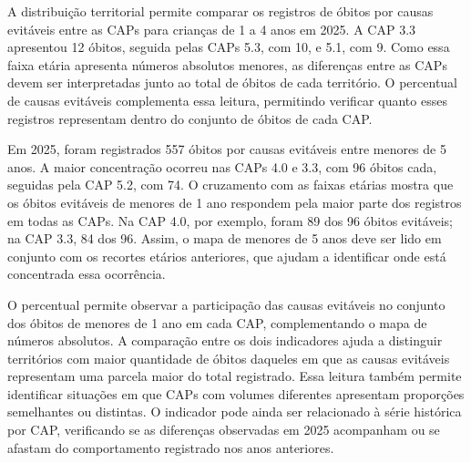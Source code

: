
A distribuição territorial permite comparar os registros de óbitos por causas evitáveis entre as CAPs para crianças de 1 a 4 anos em 2025. A CAP 3.3 apresentou 12 óbitos, seguida pelas CAPs 5.3, com 10, e 5.1, com 9. Como essa faixa etária apresenta números absolutos menores, as diferenças entre as CAPs devem ser interpretadas junto ao total de óbitos de cada território. O percentual de causas evitáveis complementa essa leitura, permitindo verificar quanto esses registros representam dentro do conjunto de óbitos de cada CAP.


Em 2025, foram registrados 557 óbitos por causas evitáveis entre menores de 5 anos. A maior concentração ocorreu nas CAPs 4.0 e 3.3, com 96 óbitos cada, seguidas pela CAP 5.2, com 74. O cruzamento com as faixas etárias mostra que os óbitos evitáveis de menores de 1 ano respondem pela maior parte dos registros em todas as CAPs. Na CAP 4.0, por exemplo, foram 89 dos 96 óbitos evitáveis; na CAP 3.3, 84 dos 96. Assim, o mapa de menores de 5 anos deve ser lido em conjunto com os recortes etários anteriores, que ajudam a identificar onde está concentrada essa ocorrência.


O percentual permite observar a participação das causas evitáveis no conjunto dos óbitos de menores de 1 ano em cada CAP, complementando o mapa de números absolutos. A comparação entre os dois indicadores ajuda a distinguir territórios com maior quantidade de óbitos daqueles em que as causas evitáveis representam uma parcela maior do total registrado. Essa leitura também permite identificar situações em que CAPs com volumes diferentes apresentam proporções semelhantes ou distintas. O indicador pode ainda ser relacionado à série histórica por CAP, verificando se as diferenças observadas em 2025 acompanham ou se afastam do comportamento registrado nos anos anteriores.

